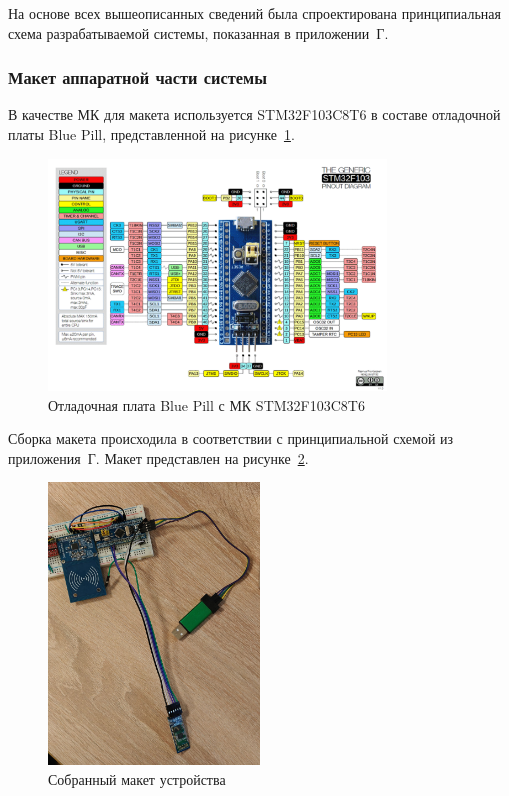 
На основе всех вышеописанных сведений была спроектирована принципиальная схема разрабатываемой системы, показанная в приложении~Г.





\subsubsection{Макет аппаратной части системы}

В качестве МК для макета используется STM32F103C8T6 в составе отладочной платы Blue Pill, представленной на рисунке~\ref{fig:blue_pill}.

\begin{figure}[H]
    \centering
    \includegraphics[width=0.8\textwidth]{images/design/blue_pill}
    \caption{\centering Отладочная плата Blue Pill с МК STM32F103C8T6}
    \label{fig:blue_pill}
\end{figure}

Сборка макета происходила в соответствии с принципиальной схемой из приложения~Г.
Макет представлен на рисунке~\ref{fig:maket}.

\begin{figure}[h]
    \centering
    \includegraphics[width=0.5\textwidth]{images/design/maket}
    \caption{\centering Собранный макет устройства}
    \label{fig:maket}
\end{figure}

